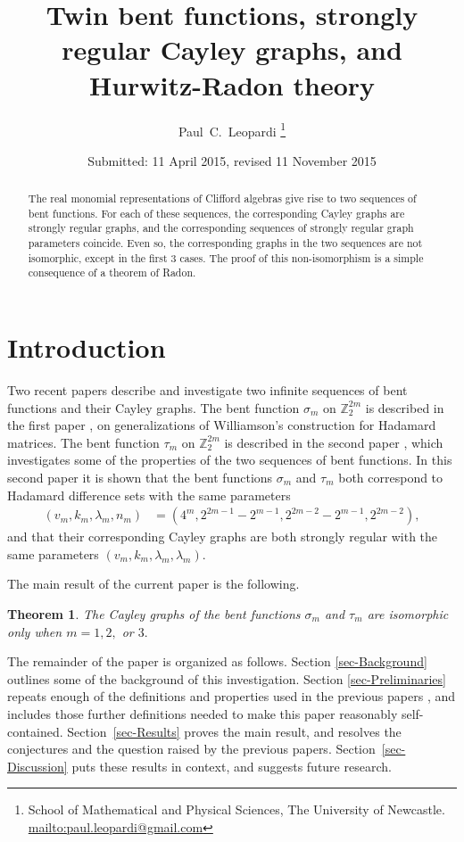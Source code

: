\documentclass[12pt,a4paper]{article}
\title{Twin bent functions, strongly regular Cayley graphs, and Hurwitz-Radon theory}
\author{
Paul~C.~Leopardi
\thanks{School of Mathematical and Physical Sciences, The University of Newcastle.
\protect\url{mailto:paul.leopardi@gmail.com}}
}
\date{Submitted: 11 April 2015, revised 11 November 2015}
\newcommand{\mb}[1]{\mathbb{#1}}
\newcommand{\Z}{\mb{Z}}
\newtheorem{Theorem}{Theorem}
\begin{document}
\maketitle

\begin{abstract}
%
The real monomial representations of Clifford algebras
give rise to two sequences of bent functions.
For each of these sequences, the corresponding Cayley graphs are 
strongly regular graphs, and the corresponding sequences of strongly regular graph parameters coincide.
Even so, the corresponding graphs in the two sequences are not isomorphic, except in the first 3 cases.
The proof of this non-isomorphism is a simple consequence of a theorem of Radon.  
%
\end{abstract}

\section{Introduction}
\label{sec-Introduction}
Two recent papers \cite{Leo14Constructions,Leo15Twin} describe and investigate two infinite sequences of bent functions and their Cayley graphs.
The bent function $\sigma_m$ on $\Z_2^{2 m}$ is described in the first paper \cite{Leo14Constructions}, on 
generalizations of Williamson's construction for Hada\-mard matrices.
The bent function $\tau_m$ on $\Z_2^{2 m}$ is described in the second paper \cite{Leo15Twin},
which investigates some of the properties of the two sequences of bent functions.
In this second paper it is shown that the bent functions $\sigma_m$ and $\tau_m$ both correspond to Hada\-mard difference sets with the same parameters
\begin{align*}
(v_m,k_m,\lambda_m,n_m) &= (4^m, 2^{2 m - 1} - 2^{m-1}, 2^{2 m - 2} - 2^{m-1}, 2^{2 m - 2}),
\end{align*}
and that their corresponding Cayley graphs are both strongly regular with the same parameters $(v_m,k_m,\lambda_m,\lambda_m)$.

The main result of the current paper is the following.
\begin{Theorem}\label{HR-non-imomorphic-theorem}
The Cayley graphs of the bent functions $\sigma_m$ and $\tau_m$ are isomorphic only when $m=1, 2,$ or $3.$ 
\end{Theorem}

The remainder of the paper is organized as follows.
Section \ref{sec-Background} outlines some of the background of this investigation.
Section \ref{sec-Preliminaries} repeats enough of the definitions and properties used in the previous papers \cite{Leo14Constructions, Leo15Twin},
and includes those further definitions needed to make this paper reasonably self-contained.
Section~\ref{sec-Results} proves the main result, and resolves the conjectures and the question raised by the previous papers.
Section~\ref{sec-Discussion} puts these results in context, and suggests future research.
\end{document}
